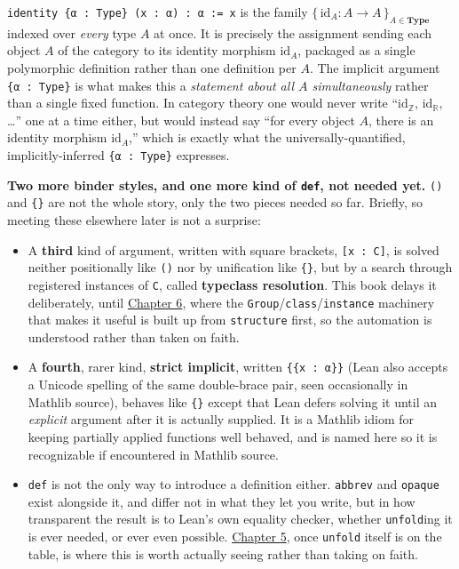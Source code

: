 \begin{mathreading}

\texttt{identity \{α : Type\} (x : α) : α := x} is the family \(\{\,\mathrm{id}_A : A \to A\,\}_{A \in \mathbf{Type}}\) indexed over \emph{every} type \(A\) at once. It is precisely the assignment sending each object \(A\) of the category to its identity morphism \(\mathrm{id}_A\), packaged as a single polymorphic definition rather than one definition per \(A\). The implicit argument \texttt{\{α : Type\}} is what makes this a \emph{statement about all \(A\) simultaneously} rather than a single fixed function. In category theory one would never write ``\(\mathrm{id}_{\mathbb{Z}}\), \(\mathrm{id}_{\mathbb{R}}\), \ldots{}'' one at a time either, but would instead say ``for every object \(A\), there is an identity morphism \(\mathrm{id}_A\),'' which is exactly what the universally-quantified, implicitly-inferred \texttt{\{α : Type\}} expresses.

\end{mathreading}

\textbf{Two more binder styles, and one more kind of \texttt{def}, not needed yet.} \texttt{()} and \texttt{\{\}} are not the whole story, only the two pieces needed so far. Briefly, so meeting these elsewhere later is not a surprise:

\begin{itemize}
\tightlist
\item
  A \textbf{third} kind of argument, written with square brackets, \texttt{[x : C]}, is solved neither positionally like \texttt{()} nor by unification like \texttt{\{\}}, but by a search through registered instances of \texttt{C}, called \textbf{typeclass resolution}. This book delays it deliberately, until \hyperref[sec:06-rigor-check:01-structure-vs-class:1]{Chapter 6}, where the \texttt{Group}/\texttt{class}/\texttt{instance} machinery that makes it useful is built up from \texttt{structure} first, so the automation is understood rather than taken on faith.
\item
  A \textbf{fourth}, rarer kind, \textbf{strict implicit}, written \texttt{\{\{x : α\}\}} (Lean also accepts a Unicode spelling of the same double-brace pair, seen occasionally in Mathlib source), behaves like \texttt{\{\}} except that Lean defers solving it until an \emph{explicit} argument after it is actually supplied. It is a Mathlib idiom for keeping partially applied functions well behaved, and is named here so it is recognizable if encountered in Mathlib source.
\item
  \texttt{def} is not the only way to introduce a definition either. \texttt{abbrev} and \texttt{opaque} exist alongside it, and differ not in what they let you write, but in how transparent the result is to Lean's own equality checker, whether \texttt{unfold}ing it is ever needed, or ever even possible. \hyperref[sec:05-tactics:04-more-tactics:1]{Chapter 5}, once \texttt{unfold} itself is on the table, is where this is worth actually seeing rather than taking on faith.
\end{itemize}

